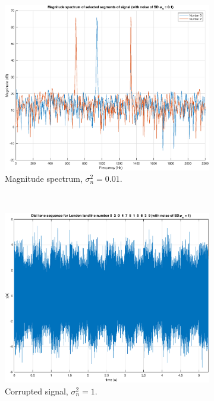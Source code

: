 \begin{figure}[H]
\begin{subfigure}{.32\textwidth}
  \centering
  \includegraphics[width=\linewidth]{assignment3figs/magspec_sd01.eps}  
  \caption{Magnitude spectrum, $\sigma_{n}^{2} = 0.01$.}
\end{subfigure}\\
\begin{subfigure}{.32\textwidth}
  \centering
  \includegraphics[width=\linewidth]{assignment3figs/sig_sd1.eps}  
  \caption{Corrupted signal, $\sigma_{n}^{2} = 1$.}
\end{subfigure}
\begin{subfigure}{.32\textwidth}
  \centering

\end{subfigure}
\end{figure}
